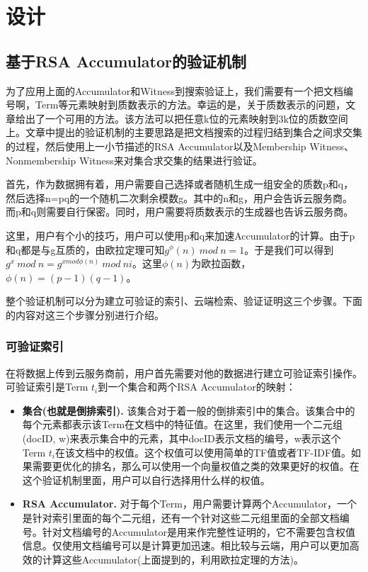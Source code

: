 \chapter{设计}
\label{chap:design}


\section{基于RSA Accumulator的验证机制}
为了应用上面的Accumulator和Witness到搜索验证上，我们需要有一个把文档编号啊，Term等元素映射到质数表示的方法。幸运的是，关于质数表示的问题，文章\cite{gennaro1999secure,goodrich2002efficient}给出了一个可用的方法。该方法可以把任意k位的元素映射到3k位的质数空间上。文章\cite{verifiableindex}中提出的验证机制的主要思路是把文档搜索的过程归结到集合之间求交集的过程，然后使用上一小节描述的RSA Accumulator以及Membership Witness、Nonmembership Witness来对集合求交集的结果进行验证。

首先，作为数据拥有着，用户需要自己选择或者随机生成一组安全的质数p和q，然后选择n=pq的一个随机二次剩余模数g。其中的n和g，用户会告诉云服务商。而p和q则需要自行保密。同时，用户需要将质数表示的生成器也告诉云服务商。

这里，用户有个小的技巧，用户可以使用p和q来加速Accumulator的计算。由于p和q都是与g互质的，由欧拉定理可知$g^\phi(n)\ mod\ n = 1$。于是我们可以得到$g^x\ mod\ n  = g^{x mod \phi(n)}\ mod\ ni$。这里$\phi(n)$为欧拉函数，$\phi(n) = (p-1)(q-1)$。

整个验证机制可以分为建立可验证的索引、云端检索、验证证明这三个步骤。下面的内容对这三个步骤分别进行介绍。

\subsection{可验证索引}
在将数据上传到云服务商前，用户首先需要对他的数据进行建立可验证索引操作。可验证索引是Term $t_i$到一个集合和两个RSA Accumulator的映射：
\begin{itemize}
\item \textbf{集合(也就是倒排索引).} 该集合对于着一般的倒排索引中的集合。该集合中的每个元素都表示该Term在文档中的特征值。在这里，我们使用一个二元组(docID, w)来表示集合中的元素，其中docID表示文档的编号，w表示这个Term $t_i$在该文档中的权值。这个权值可以使用简单的TF值或者TF-IDF值。如果需要更优化的排名，那么可以使用一个向量权值之类的效果更好的权值。在这个验证机制里面，用户可以自行选择用什么样的权值。
\item \textbf{RSA Accumulator.} 对于每个Term，用户需要计算两个Accumulator，一个是针对索引里面的每个二元组，还有一个针对这些二元组里面的全部文档编号。针对文档编号的Accumulator是用来作完整性证明的，它不需要包含权值信息。仅使用文档编号可以是计算更加迅速。相比较与云端，用户可以更加高效的计算这些Accumulator(上面提到的，利用欧拉定理的方法)。
\end{itemize}

